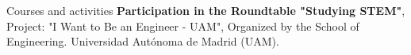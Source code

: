 \begin{rubric}{Courses and activities}
\entry*[June 2022] \textbf{Participation in the Roundtable "Studying STEM"}, Project: "I Want to Be an Engineer - UAM", Organized by the School of Engineering. Universidad Autónoma de Madrid (UAM).












\end{rubric}